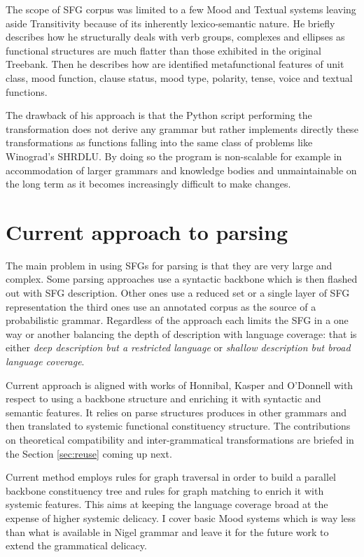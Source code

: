 The scope of SFG corpus was limited to a few Mood and Textual systems leaving aside Transitivity because of its inherently lexico-semantic nature. He briefly describes how he structurally deals with verb groups, complexes and ellipses as functional structures are much flatter than those exhibited in the original Treebank. Then he describes how are identified metafunctional features of unit class, mood function, clause status, mood type, polarity, tense, voice and textual functions.

The drawback of his approach is that the Python script performing the transformation does not derive any grammar but rather implements directly these transformations as functions falling into the same class of problems like Winograd's SHRDLU. By doing so the program is non-scalable for example in accommodation of larger grammars and knowledge bodies and unmaintainable on the long term as it becomes increasingly difficult to make changes. 


\section{Current approach to parsing}
The main problem in using SFGs for parsing is that they are very large and complex. Some parsing approaches use a syntactic backbone which is then flashed out with SFG description. Other ones use a reduced set or a single layer of SFG representation the third ones use an annotated corpus as the source of a probabilistic grammar. Regardless of the approach each limits the SFG in a one way or another balancing the depth of description with language coverage: that is either \textit{deep description but a restricted language} or \textit{shallow description but broad language coverage}. 

Current approach is aligned with works of Honnibal, Kasper and O'Donnell with respect to using a backbone structure and enriching it with syntactic and semantic features. It relies on parse structures produces in other grammars and then translated to systemic functional constituency structure. The contributions on theoretical compatibility and inter-grammatical transformations are briefed in the Section \ref{sec:reuse} coming up next. 

Current method employs rules for graph traversal in order to build a parallel backbone constituency tree and rules for graph matching to enrich it with systemic features. This aims at keeping the language coverage broad at the expense of higher systemic delicacy. I cover basic Mood systems which is way less than what is available in Nigel grammar and leave it for the future work to extend the grammatical delicacy.

